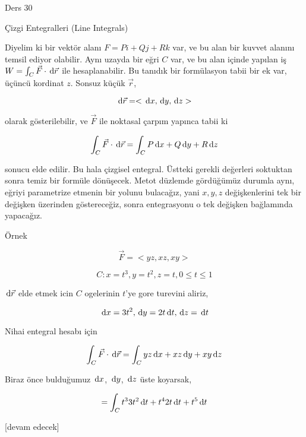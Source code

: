 \documentclass[12pt,fleqn]{article}\usepackage{../../common}
\begin{document}
Ders 30

Çizgi Entegralleri (Line Integrals)

Diyelim ki bir vektör alanı $F = P i + Qj + Rk$ var, ve bu alan bir kuvvet
alanını temsil ediyor olabilir. Aynı uzayda bir eğri $C$ var, ve bu alan içinde
yapılan iş $W = \int_C \vec{F} \cdot \,\mathrm{d} \vec{r}$ ile hesaplanabilir. Bu tanıdık
bir formülasyon tabii bir ek var, üçüncü kordinat $z$. Sonsuz küçük $\vec{r}$,

$$
\,\mathrm{d}\vec{r} = < \,\mathrm{d} x, \,\mathrm{d} y, \,\mathrm{d} z >
$$

olarak gösterilebilir, ve $\vec{F}$ ile noktasal çarpım yapınca tabii ki

$$
\int_C \vec{F} \cdot \,\mathrm{d} \vec{r} =
\int_C P \,\mathrm{d} x + Q \,\mathrm{d} y + R \,\mathrm{d} z
$$

sonucu elde edilir. Bu hala çizgisel entegral. Üstteki gerekli değerleri
soktuktan sonra temiz bir formüle dönüşecek. Metot düzlemde gördüğümüz durumla
aynı, eğriyi parametrize etmenin bir yolunu bulacağız, yani $x,y,z$
değişkenlerini tek bir değişken üzerinden göstereceğiz, sonra entegrasyonu
o tek değişken bağlamında yapacağız.

Örnek

$$
\vec{F} = < yz, xz, xy >
$$

$$
C: x=t^3, y=t^2, z=t, 0 \le t \le 1
$$

$\,\mathrm{d}\vec{r}$ elde etmek icin $C$ ogelerinin $t$'ye gore turevini aliriz,

$$
\,\mathrm{d} x = 3t^2, \,\mathrm{d} y = 2t \,\mathrm{d} t, \,\mathrm{d} z = \,\mathrm{d} t
$$

Nihai entegral hesabı için 

$$
\int_C \vec{F} \cdot \,\mathrm{d} \vec{r} =
\int_C yz \,\mathrm{d} x + xz \,\mathrm{d} y + xy \,\mathrm{d} z
$$

Biraz önce bulduğumuz $\,\mathrm{d} x$, $\,\mathrm{d} y$, $\,\mathrm{d} z$ üste koyarsak,

$$
= \int_C t^3 3t^2 \,\mathrm{d} t + t^4 2t \,\mathrm{d} t + t^5 \,\mathrm{d} t
$$













[devam edecek]
\end{document}
